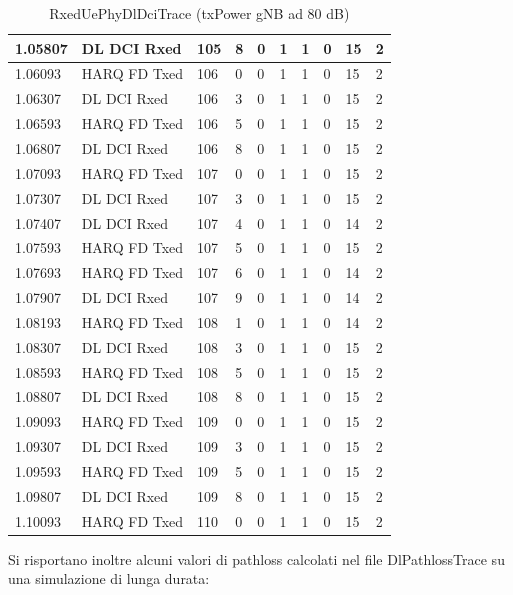 \documentclass[12pt,a4paper]{article}
\begin{document}
\begin{table}[!ht]
\begin{tabular}{|l|l|l|l|l|l|l|l|l|l|}
        1.05807 & DL DCI Rxed & 105 & 8 & 0 & 1 & 1 & 0 & 15 & 2 \\ \hline
        1.06093 & HARQ FD Txed & 106 & 0 & 0 & 1 & 1 & 0 & 15 & 2 \\ \hline
        1.06307 & DL DCI Rxed & 106 & 3 & 0 & 1 & 1 & 0 & 15 & 2 \\ \hline
        1.06593 & HARQ FD Txed & 106 & 5 & 0 & 1 & 1 & 0 & 15 & 2 \\ \hline
        1.06807 & DL DCI Rxed & 106 & 8 & 0 & 1 & 1 & 0 & 15 & 2 \\ \hline
        1.07093 & HARQ FD Txed & 107 & 0 & 0 & 1 & 1 & 0 & 15 & 2 \\ \hline
        1.07307 & DL DCI Rxed & 107 & 3 & 0 & 1 & 1 & 0 & 15 & 2 \\ \hline
        1.07407 & DL DCI Rxed & 107 & 4 & 0 & 1 & 1 & 0 & 14 & 2 \\ \hline
        1.07593 & HARQ FD Txed & 107 & 5 & 0 & 1 & 1 & 0 & 15 & 2 \\ \hline
        1.07693 & HARQ FD Txed & 107 & 6 & 0 & 1 & 1 & 0 & 14 & 2 \\ \hline
        1.07907 & DL DCI Rxed & 107 & 9 & 0 & 1 & 1 & 0 & 14 & 2 \\ \hline
        1.08193 & HARQ FD Txed & 108 & 1 & 0 & 1 & 1 & 0 & 14 & 2 \\ \hline
        1.08307 & DL DCI Rxed & 108 & 3 & 0 & 1 & 1 & 0 & 15 & 2 \\ \hline
        1.08593 & HARQ FD Txed & 108 & 5 & 0 & 1 & 1 & 0 & 15 & 2 \\ \hline
        1.08807 & DL DCI Rxed & 108 & 8 & 0 & 1 & 1 & 0 & 15 & 2 \\ \hline
        1.09093 & HARQ FD Txed & 109 & 0 & 0 & 1 & 1 & 0 & 15 & 2 \\ \hline
        1.09307 & DL DCI Rxed & 109 & 3 & 0 & 1 & 1 & 0 & 15 & 2 \\ \hline
        1.09593 & HARQ FD Txed & 109 & 5 & 0 & 1 & 1 & 0 & 15 & 2 \\ \hline
        1.09807 & DL DCI Rxed & 109 & 8 & 0 & 1 & 1 & 0 & 15 & 2 \\ \hline
        1.10093 & HARQ FD Txed & 110 & 0 & 0 & 1 & 1 & 0 & 15 & 2 \\ \hline
    \end{tabular}
    \caption{RxedUePhyDlDciTrace (txPower gNB ad 80 dB)}
\end{table}

\cleardoublepage

Si risportano inoltre alcuni valori di pathloss calcolati nel file DlPathlossTrace su una simulazione di lunga durata:
\end{document}
